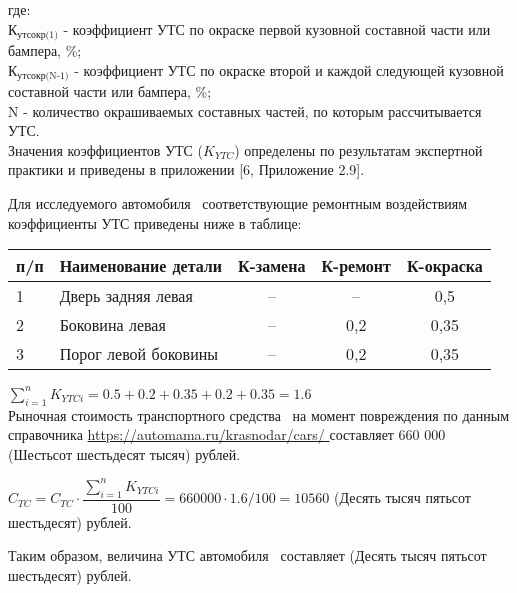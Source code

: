 \noindent где:\\
\noindent $ \text{К}_{\text{утсокр(1)}} $ - коэффициент УТС по окраске первой кузовной составной части или бампера, \%;\\
$ \text{К}_{\text{утсокр(N-1)}} $ - коэффициент УТС по окраске второй и каждой следующей кузовной составной части или бампера, \%;\\
N - количество окрашиваемых составных частей, по которым рассчитывается УТС.\\
Значения коэффициентов УТС ($ K_{YTC} $) определены по результатам экспертной практики и приведены в приложении [6, Приложение 2.9].

\par Для исследуемого автомобиля  \, соответствующие ремонтным воздействиям  коэффициенты УТС приведены ниже в таблице:

\begin{table}[H]
	\begin{tabular}{|p{5mm}|p{80mm}|c|c|c|}
	\hline 
	\textbf{п/п} & \textbf{Наименование детали} &\textbf{ К-замена }& \textbf{К-ремонт }&\textbf{ К-окраска} \\ 
	\hline 
	1 & Дверь задняя левая & -- & -- & 0,5 \\ 
	\hline 
	2 & Боковина левая & -- & 0,2 & 0,35 \\ 
	\hline 
		3 & Порог левой боковины  & -- & 0,2 & 0,35 \\ 
	\hline 

	
\end{tabular} 

\end{table}

\vspace{7mm}

$  \sum\limits_{i=1}^n K_{YTCi} = 0.5+0.2+0.35+0.2+0.35 = 1.6$\\
  
  
Рыночная стоимость транспортного средства \, на момент повреждения по данным справочника \url { https://automama.ru/krasnodar/cars/ } составляет 660 000 (Шестьсот шестьдесят тысяч) рублей.
  
$   C_{TC} = C_{TC} \cdot \dfrac{\sum\limits_{i=1}^n K_{YTCi}}{100} = 660000 \cdot 1.6/100 = 10560 $%
(Десять тысяч пятьсот шестьдесят) рублей.

\par Таким образом, величина УТС автомобиля \, составляет (Десять тысяч пятьсот шестьдесят) рублей.